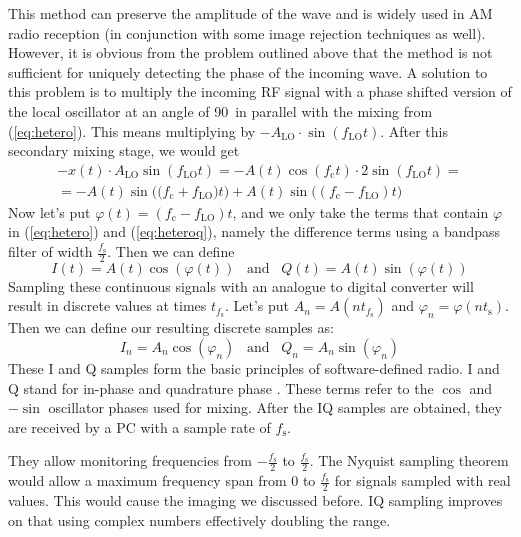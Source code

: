 \documentclass[a4paper,12pt,twoside,openright]{report}
\begin{document}
This method can preserve the amplitude of the wave and is widely used in AM radio reception (in conjunction with some image rejection techniques as well). However, it is obvious from the problem outlined above that the method is not sufficient for uniquely detecting the phase of the incoming wave. A solution to this problem is to multiply the incoming RF signal with a phase shifted version of the local oscillator at an angle of 90\degree\ in parallel with the mixing from (\ref{eq:hetero}). This means multiplying by $-A_\text{LO} \cdot \sin(f_\text{LO} t)$. After this secondary mixing stage, we would get
\begin{multline}
\label{eq:heteroq}
- x(t) \cdot A_\text{LO} \sin(f_\text{LO} t) =  -A(t) \cos(f_\text{c} t) \cdot 2 \sin(f_\text{LO} t) = \\
=  - A(t) \sin\big( (f_\text{c} + f_\text{LO} \big) t\big) + A(t) \sin\big( (f_\text{c} - f_\text{LO}) t \big)
\end{multline}
Now let's put $\varphi(t) = (f_\text{c}-f_\text{LO}) t$, and we only take the terms that contain $\varphi$ in (\ref{eq:hetero}) and (\ref{eq:heteroq}), namely the difference terms using a bandpass filter of width $\frac{f_\text{s}}{2}$. Then we can define
\begin{equation}
I(t) = A(t) \cos( \varphi (t)) \,\,\,\,\, \text{and} \,\,\,\,\, Q(t) = A(t) \sin( \varphi (t))
\end{equation}
Sampling these continuous signals with an analogue to digital converter will result in discrete values at times $t_{f_\text{s}}$. Let's put $A_{n} = A(n t_{f_\text{s}})$ and $\varphi_{n} = \varphi(n t_\text{s})$. Then we can define our resulting discrete samples as:
\begin{equation}
I_{n} = A_{n} \cos( \varphi_{n} ) \,\,\,\,\, \text{and} \,\,\,\,\, Q_{n} = A_{n} \sin( \varphi _{n})
\end{equation}
These I and Q samples form the basic principles of software-defined radio. I and Q stand for in-phase and quadrature phase \cite{kirkhorn1999introduction}. These terms refer to the $\cos$ and $-\sin$ oscillator phases used for mixing. After the IQ samples are obtained, they are received by a PC with a sample rate of $f_\text{s}$.

They allow monitoring frequencies from $-\frac{f_\text{s}}{2}$ to $\frac{f_\text{s}}{2}$. The Nyquist sampling theorem would allow a maximum frequency span from $0$ to $\frac{f_\text{s}}{2}$ for signals sampled with real values. This would cause the imaging we discussed before. IQ sampling improves on that using complex numbers effectively doubling the range.
\end{document}
